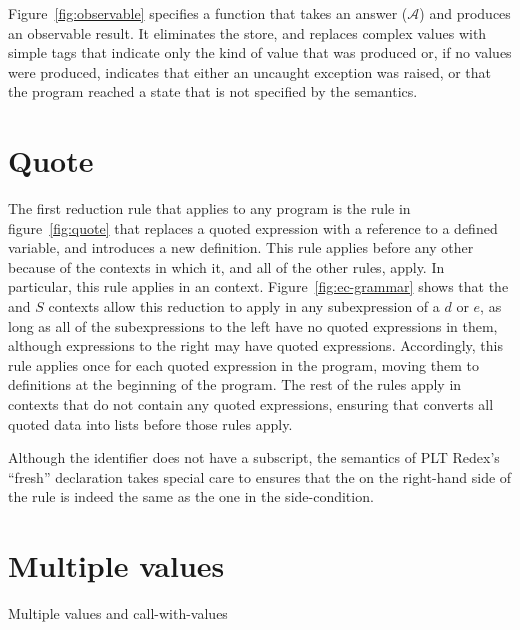 Figure~\ref{fig:observable} specifies a function that takes an answer ($\mathcal{A}$) and produces an observable result. It eliminates the store, and replaces complex values with simple tags that indicate only the kind of value that was produced or, if no values were produced, indicates that either an uncaught exception was raised, or that the program reached a state that is not specified by the semantics.

\section{Quote}\label{sec:semantics:quote}

The first reduction rule that applies to any program is the
 rule in figure~\ref{fig:quote} that replaces a
quoted expression with a reference
to a defined variable, and introduces a new definition. This rule
applies before any other because of the contexts in which it, and all
of the other rules, apply. In particular, this rule applies in an
 context. Figure~\ref{fig:ec-grammar} shows that the
 and $S$ contexts allow this reduction to apply in
any subexpression of a $d$ or $e$, as long as all of the
subexpressions to the left have no quoted expressions in them,
although expressions to the right may have quoted expressions.
Accordingly, this rule applies once for each quoted expression in the
program, moving them to definitions at the beginning of the program.
The rest of the rules apply in contexts that do not contain any quoted
expressions, ensuring that  converts all quoted data
into lists before those rules apply.

Although the identifier  does not have a subscript, the semantics of PLT Redex's ``fresh'' declaration takes special care to ensures that the  on the right-hand side of the rule is indeed the same as the one in the side-condition.

\section{Multiple values}

\beginfig
\begin{center}

\end{center}
\caption{Multiple values and call-with-values}\label{fig:Multiple--values--and--call-with-values}
\endfig

